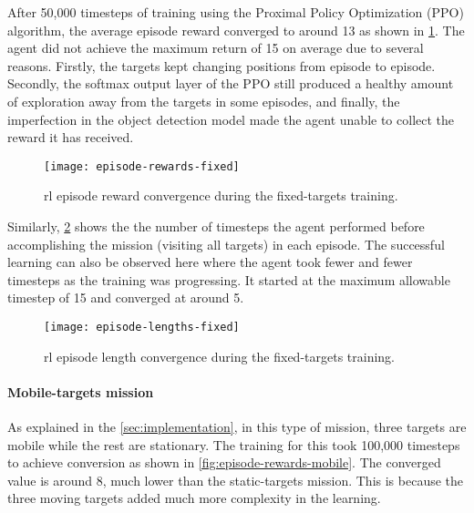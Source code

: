 \documentclass[../main.tex]{subfiles}
\begin{document}
After 50,000 timesteps of training using the Proximal Policy
Optimization (PPO) algorithm, the average episode reward converged
to around 13 as shown in \cref{fig:episode-rewards-fixed}.
The agent did not achieve the maximum return of 15
on average
due to several reasons. Firstly, the
targets kept changing positions from episode to episode.
Secondly, the softmax output layer of the PPO still produced 
a healthy amount
of exploration away from the targets in some episodes,
and finally, the imperfection in the object detection model made
the agent unable to collect the reward it has received. 

\begin{figure}[tbp]
	\centering
	\texttt{[image: episode-rewards-fixed]}
        \caption{\gls{rl} episode reward convergence during the
        fixed-targets training.}
        \label{fig:episode-rewards-fixed}
\end{figure}

Similarly, \cref{fig:episode-lengths-fixed} shows the the number of
timesteps the agent performed before accomplishing the mission
(visiting all targets) in each episode.
The successful learning can also be observed here where the agent took
fewer and fewer timesteps as the training was progressing.
It started at the maximum allowable timestep of 15 and converged at
around 5.

\begin{figure}[tbp]
	\centering
	\texttt{[image: episode-lengths-fixed]}
        \caption{\gls{rl} episode length convergence during the
        fixed-targets training.}
        \label{fig:episode-lengths-fixed}
\end{figure}

\paragraph{Mobile-targets mission}

As explained in the \cref{sec:implementation}, in this type of
mission, three targets are mobile while the rest are stationary.
The training for this took 100,000 timesteps to achieve conversion as
shown in \cref{fig:episode-rewards-mobile}.
The converged value is around 8, much lower than the static-targets
mission.
This is because the three moving targets added much more complexity in the
learning.
\end{document}
